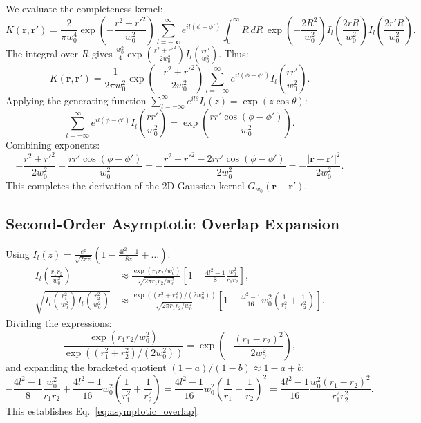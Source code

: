 \documentclass{optica-article}
\begin{document}
We evaluate the completeness kernel:
\begin{equation}
K(\mathbf{r}, \mathbf{r}') = \frac{2}{\pi w_0^4} \exp\left( - \frac{r^2 + r'^2}{w_0^2} \right) \sum_{l=-\infty}^\infty e^{i l(\phi - \phi')} \int_0^\infty R \, dR \, \exp\left( - \frac{2 R^2}{w_0^2} \right) I_l\left( \frac{2 r R}{w_0^2} \right) I_l\left( \frac{2 r' R}{w_0^2} \right).
\end{equation}
The integral over $R$ gives $\frac{w_0^2}{4} \exp(\frac{r^2 + r'^2}{2 w_0^2}) I_l(\frac{r r'}{w_0^2})$. Thus:
\begin{equation}
K(\mathbf{r}, \mathbf{r}') = \frac{1}{2\pi w_0^2} \exp\left( - \frac{r^2 + r'^2}{2 w_0^2} \right) \sum_{l=-\infty}^\infty e^{i l(\phi - \phi')} I_l\left( \frac{r r'}{w_0^2} \right).
\end{equation}
Applying the generating function $\sum_{l=-\infty}^\infty e^{i l \theta} I_l(z) = \exp(z \cos \theta)$:
\begin{equation}
\sum_{l=-\infty}^\infty e^{i l(\phi - \phi')} I_l\left( \frac{r r'}{w_0^2} \right) = \exp\left( \frac{r r' \cos(\phi - \phi')}{w_0^2} \right).
\end{equation}
Combining exponents:
\begin{equation}
- \frac{r^2 + r'^2}{2 w_0^2} + \frac{r r' \cos(\phi - \phi')}{w_0^2} = - \frac{r^2 + r'^2 - 2 r r' \cos(\phi - \phi')}{2 w_0^2} = - \frac{|\mathbf{r} - \mathbf{r}'|^2}{2 w_0^2}.
\end{equation}
This completes the derivation of the 2D Gaussian kernel $G_{w_0}(\mathbf{r} - \mathbf{r}')$.

\subsection{Second-Order Asymptotic Overlap Expansion}

Using $I_l(z) = \frac{e^z}{\sqrt{2\pi z}} (1 - \frac{4l^2 - 1}{8z} + \dots)$:
\begin{align}
I_l\left( \frac{r_1 r_2}{w_0^2} \right) &\approx \frac{\exp(r_1 r_2 / w_0^2)}{\sqrt{2\pi r_1 r_2 / w_0^2}} \left[ 1 - \frac{4l^2 - 1}{8} \frac{w_0^2}{r_1 r_2} \right], \\
\sqrt{I_l\left( \frac{r_1^2}{w_0^2} \right) I_l\left( \frac{r_2^2}{w_0^2} \right)} &\approx \frac{\exp((r_1^2 + r_2^2) / (2 w_0^2))}{\sqrt{2\pi r_1 r_2 / w_0^2}} \left[ 1 - \frac{4l^2 - 1}{16} w_0^2 \left( \frac{1}{r_1^2} + \frac{1}{r_2^2} \right) \right].
\end{align}
Dividing the expressions:
\begin{equation}
\frac{\exp(r_1 r_2 / w_0^2)}{\exp((r_1^2 + r_2^2) / (2 w_0^2))} = \exp\left( - \frac{(r_1 - r_2)^2}{2 w_0^2} \right),
\end{equation}
and expanding the bracketed quotient $(1 - a)/(1 - b) \approx 1 - a + b$:
\begin{equation}
- \frac{4l^2 - 1}{8} \frac{w_0^2}{r_1 r_2} + \frac{4l^2 - 1}{16} w_0^2 \left( \frac{1}{r_1^2} + \frac{1}{r_2^2} \right) = \frac{4l^2 - 1}{16} w_0^2 \left( \frac{1}{r_1} - \frac{1}{r_2} \right)^2 = \frac{4l^2 - 1}{16} \frac{w_0^2 (r_1 - r_2)^2}{r_1^2 r_2^2}.
\end{equation}
This establishes Eq.~\eqref{eq:asymptotic_overlap}.



\end{document}
